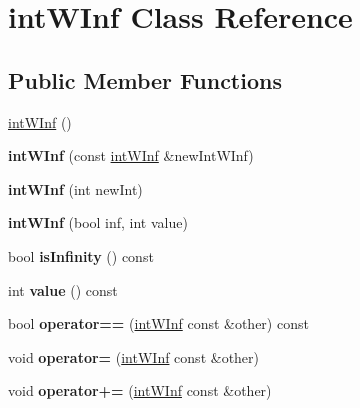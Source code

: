 \hypertarget{classintWInf}{
\section{intWInf Class Reference}
\label{classintWInf}
}
\subsection*{Public Member Functions}
\begin{DoxyCompactItemize}
\item 
\hyperlink{classintWInf_afcd82a5220856b169c7d20d8368ce9b9}{intWInf} ()
\item 
\hypertarget{classintWInf_aa84dec4f5bf70c39ab9380f7f09c69c8}{
{\bfseries intWInf} (const \hyperlink{classintWInf}{intWInf} \&newIntWInf)}
\label{classintWInf_aa84dec4f5bf70c39ab9380f7f09c69c8}

\item 
\hypertarget{classintWInf_a463400a76fd1b757004c920fe6fedefa}{
{\bfseries intWInf} (int newInt)}
\label{classintWInf_a463400a76fd1b757004c920fe6fedefa}

\item 
\hypertarget{classintWInf_ae738232f1796e58b8d21376736030ed9}{
{\bfseries intWInf} (bool inf, int value)}
\label{classintWInf_ae738232f1796e58b8d21376736030ed9}

\item 
\hypertarget{classintWInf_a86880c13264f092d7477062c5a9ace12}{
bool {\bfseries isInfinity} () const }
\label{classintWInf_a86880c13264f092d7477062c5a9ace12}

\item 
\hypertarget{classintWInf_a2e0f61ac4ff14af4f173cf60b93c9ca0}{
int {\bfseries value} () const }
\label{classintWInf_a2e0f61ac4ff14af4f173cf60b93c9ca0}

\item 
\hypertarget{classintWInf_aa782481749150f08791ba195f818210c}{
bool {\bfseries operator==} (\hyperlink{classintWInf}{intWInf} const \&other) const }
\label{classintWInf_aa782481749150f08791ba195f818210c}

\item 
\hypertarget{classintWInf_a7be3f69f204f99c961e6087b9ada4795}{
void {\bfseries operator=} (\hyperlink{classintWInf}{intWInf} const \&other)}
\label{classintWInf_a7be3f69f204f99c961e6087b9ada4795}

\item 
\hypertarget{classintWInf_a347231bb100e4798db127839198034a8}{
void {\bfseries operator+=} (\hyperlink{classintWInf}{intWInf} const \&other)}
\label{classintWInf_a347231bb100e4798db127839198034a8}


\end{DoxyCompactItemize}
